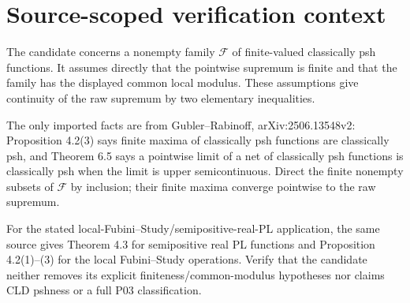 \section*{Source-scoped verification context}

The candidate concerns a nonempty family $\mathcal F$ of finite-valued
classically psh functions.  It assumes directly that the pointwise supremum
is finite and that the family has the displayed common local modulus.  These
assumptions give continuity of the raw supremum by two elementary inequalities.

The only imported facts are from Gubler--Rabinoff, arXiv:2506.13548v2:
Proposition 4.2(3) says finite maxima of classically psh functions are
classically psh, and Theorem 6.5 says a pointwise limit of a net of
classically psh functions is classically psh when the limit is upper
semicontinuous.  Direct the finite nonempty subsets of $\mathcal F$ by
inclusion; their finite maxima converge pointwise to the raw supremum.

For the stated local-Fubini--Study/semipositive-real-PL application, the same
source gives Theorem 4.3 for semipositive real PL functions and Proposition
4.2(1)--(3) for the local Fubini--Study operations.  Verify that the
candidate neither removes its explicit finiteness/common-modulus hypotheses
nor claims CLD pshness or a full P03 classification.
